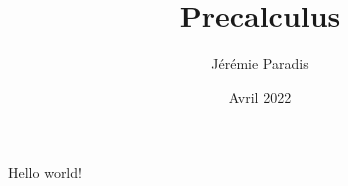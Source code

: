 \documentclass{article}
\title{Precalculus}
\author{Jérémie Paradis}
\date{Avril 2022}
\begin{document}
    \maketitle
    Hello world!
    \sum 
\end{document}
